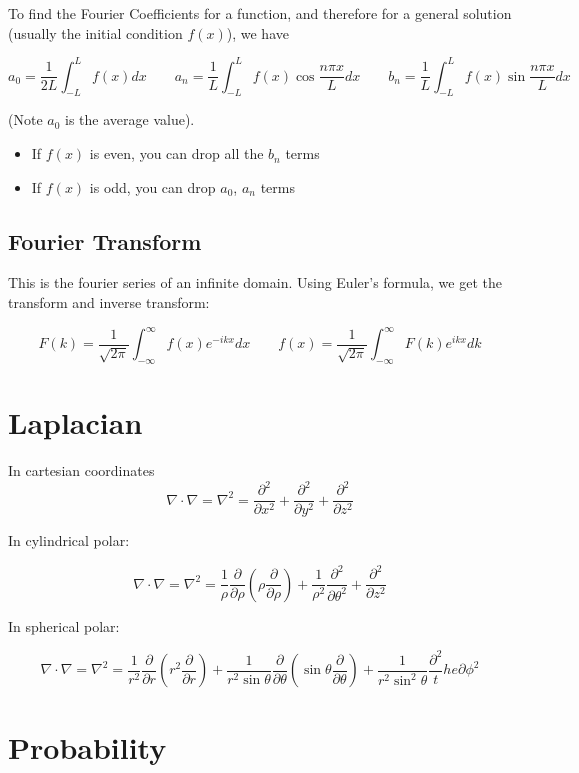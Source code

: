 \documentclass{article}
\begin{document}
To find the Fourier Coefficients for a function, and therefore for a general solution (usually the initial condition $f(x)$), we have

$$
a_0 = \frac{1}{2L} \int_{-L}^{L} f(x) dx
\qquad
a_n = \frac{1}{L} \int_{-L}^{L} f(x) \cos\frac{n\pi x}{L} dx
\qquad
b_n = \frac{1}{L} \int_{-L}^{L} f(x) \sin\frac{n \pi x}{L} dx
$$

(Note $a_0$ is the average value).
\begin{itemize}
	\item If $f(x)$ is even, you can drop all the $b_n$ terms
	\item If $f(x)$ is odd, you can drop $a_0$, $a_n$ terms
\end{itemize}

\subsection{Fourier Transform}

This is the fourier series of an infinite domain.  Using Euler's formula, we get the transform and inverse transform:

$$
F(k) = \frac{1}{\sqrt{2\pi}} \int_{-\infty}^{\infty} f(x) e^{-ikx}dx 
\qquad
f(x) = \frac{1}{\sqrt{2\pi}} \int_{-\infty}^{\infty} F(k) e^{ikx}dk
$$

\section{Laplacian}
In cartesian coordinates
$$
\nabla \cdot \nabla = \nabla^2 = \frac{\partial^2}{\partial x^2} + \frac{\partial^2}{\partial y^2} + \frac{\partial^2}{\partial z^2}
$$

In cylindrical polar:

$$
\nabla \cdot \nabla = \nabla^2 = \frac{1}{\rho}\frac{\partial}{\partial \rho}\left( \rho\frac{\partial}{\partial\rho}\right) + \frac{1}{\rho^2}\frac{\partial^2}{\partial \theta^2} + \frac{\partial^2}{\partial z^2}
$$

In spherical polar:

$$
\nabla \cdot \nabla = \nabla^2 =
\frac{1}{r^2}\frac{\partial}{\partial r}\left( r^2 \frac{\partial}{\partial r} \right) + \frac{1}{r^2 \sin \theta}\frac{\partial}{\partial \theta} \left( \sin \theta \frac{\partial}{\partial \theta} \right) + \frac{1}{r^2 \sin^2 \theta} \frac{\partial^2}the{\partial \phi^2}
$$

\section{Probability}
\end{document}

